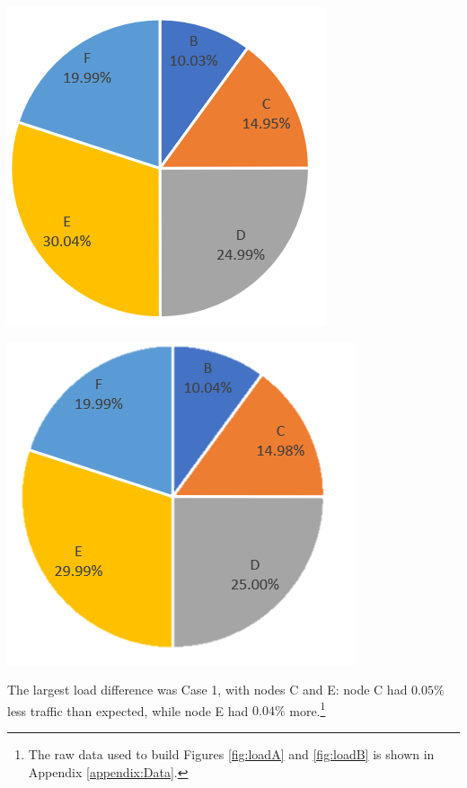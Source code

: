 \documentclass{article}
\begin{document}
\begin{minipage}{0.5\textwidth}
\centering
\includegraphics[scale=0.7]{Images/LoadA.PNG}
\label{fig:loadA}
\end{minipage}
\begin{minipage}{0.5\textwidth}
\centering
\includegraphics[scale=0.7]{Images/LoadB.PNG}
\label{fig:loadB}
\end{minipage}
\newline

The largest load difference was Case 1, with nodes C and E:  node C had $0.05\%$ less traffic than expected, while node E had $0.04\%$ more.\footnote{The raw data used to build Figures \ref{fig:loadA} and \ref{fig:loadB} is shown in Appendix \ref{appendix:Data}.}
\end{document}
